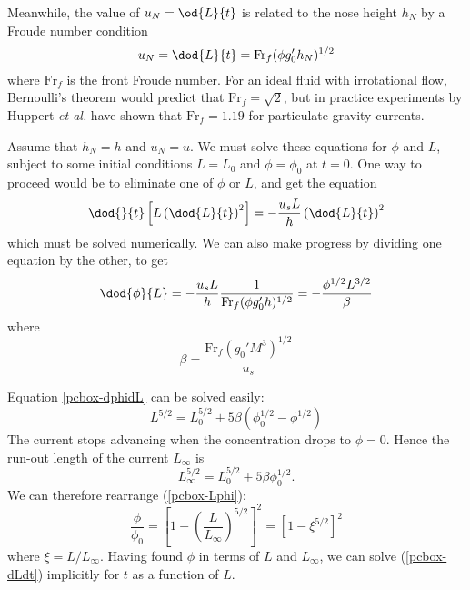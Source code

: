 Meanwhile, the value of $u_N = \od{L}{t}$ is related to the nose height $h_N$ by a Froude number condition
\begin{equation}
u_N = \dod{L}{t} = \mathrm{Fr}_f (\phi g_0' h_N)^{1/2} 
 \label{pcbox-dLdt}
\end{equation}
where $\mathrm{Fr}_f$ is the front Froude number. For an ideal fluid with
irrotational flow, Bernoulli's theorem would predict that $\mathrm{Fr}_f =
\sqrt{2}$, but in practice experiments by Huppert \textit{et al.} have shown
that $\mathrm{Fr}_f = 1.19$ for particulate gravity currents.\cite{huppert-1998}

Assume that $h_N = h$ and $u_N = u$. We must solve these equations for $\phi$ and $L$, subject to some initial conditions $L=L_0$ and $\phi=\phi_0$ at $t=0$. One way to proceed would be to eliminate one of $\phi$ or $L$, and get the equation
\begin{equation}
 \dod{}{t}\left[ L\left( \dod{L}{t}\right)^2 \right] = -\frac{u_s L}{h} \left(\dod{L}{t}\right)^2
\end{equation}
which must be solved numerically. We can also make progress by dividing one equation by the other, to get
\begin{equation}
\dod{\phi}{L} = -\frac{u_s L}{h} \frac{1}{\mathrm{Fr}_f (\phi g_0' h)^{1/2}} = -\frac{\phi^{1/2} L^{3/2}}{\beta} 
 \label{pcbox-dphidL}
\end{equation}
where
\begin{equation}
\beta = \frac{\mathrm{Fr}_f (g_0' M^3)^{1/2}}{u_s}
\end{equation}

Equation \ref{pcbox-dphidL} can be solved easily:
\begin{equation}
 L^{5/2} =  L_0^{5/2} + 5\beta \left(\phi_0^{1/2} - \phi^{1/2} \right) 
 \label{pcbox-Lphi}
\end{equation}
The current stops advancing when the concentration drops to $\phi = 0$. Hence the run-out length of the current $L_\infty$ is
\begin{equation}
 L_\infty^{5/2} =  L_0^{5/2} + 5\beta \phi_0^{1/2}.
\end{equation}
We can therefore rearrange (\ref{pcbox-Lphi}):
\begin{equation}
 \frac{\phi}{\phi_0} = \left[ 1-\left(\frac{L}{L_\infty}\right)^{5/2} \right]^2 = \left[ 1 - \xi^{5/2} \right]^2
\end{equation}
where $\xi = L/L_\infty$. 
Having found $\phi$ in terms of $L$ and $L_\infty$, we can solve (\ref{pcbox-dLdt}) implicitly for $t$ as a function of $L$. 

